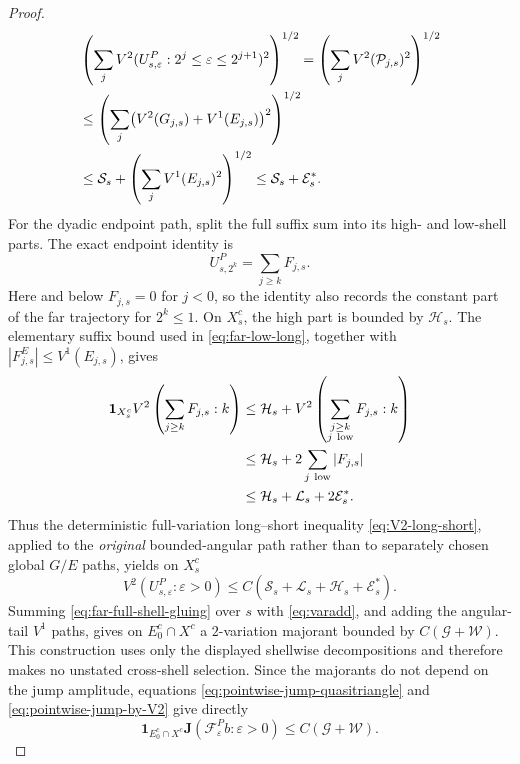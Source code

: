 \documentclass[11pt]{article}
\numberwithin{equation}{section}
\theoremstyle{remark}
\theoremstyle{definition}
\newcommand{\cF}{\mathcal F}
\begin{document}
\begin{proof}
\begin{align}
 &\left(\sum_j
 V^2(U^P_{s,\varepsilon}:2^j\le\varepsilon\le2^{j+1})^2\right)^{1/2}
 =\left(\sum_jV^2(\mathcal P_{j,s})^2\right)^{1/2}\notag\\
 &\le \left(\sum_j
       \bigl(V^2(G_{j,s})+V^1(E_{j,s})\bigr)^2\right)^{1/2}\notag\\
 &\le \mathcal S_s+
       \left(\sum_jV^1(E_{j,s})^2\right)^{1/2}
 \le \mathcal S_s+\mathcal E_s^*.
 \label{eq:far-full-short-gluing}
\end{align}
For the dyadic endpoint path, split the full suffix sum into its high- and
low-shell parts.  The exact endpoint identity is
\[
 U^P_{s,2^k}=\sum_{j\ge k}F_{j,s}.
\]
Here and below \(F_{j,s}=0\) for \(j<0\), so the identity also records the
constant part of the far trajectory for \(2^k\le1\).
On \(X_s^c\), the high part is bounded by
\(\mathcal H_s\).  The elementary suffix bound used in
\eqref{eq:far-low-long}, together with
\(|F^E_{j,s}|\le V^1(E_{j,s})\), gives
\begin{align}
 \mathbf1_{X_s^c}
 V^2\left(\sum_{j\ge k}F_{j,s}:k\right)
 &\le \mathcal H_s+
       V^2\left(\sum_{\substack{j\ge k\\j\ {\rm low}}}F_{j,s}:k\right)
       \notag\\
 &\le \mathcal H_s+2\sum_{j\ {\rm low}}|F_{j,s}|\notag\\
 &\le \mathcal H_s+\mathcal L_s+2\mathcal E_s^*.
 \label{eq:far-full-long-gluing}
\end{align}
Thus the deterministic full-variation long--short inequality
\eqref{eq:V2-long-short}, applied to the \emph{original} bounded-angular
path rather than to separately chosen global \(G/E\) paths, yields on
\(X_s^c\)
\begin{equation}\label{eq:far-full-shell-gluing}
 V^2(U^P_{s,\varepsilon}:\varepsilon>0)
 \le C(\mathcal S_s+\mathcal L_s+\mathcal H_s+\mathcal E_s^*).
\end{equation}
Summing \eqref{eq:far-full-shell-gluing} over \(s\) with
\eqref{eq:varadd}, and adding the angular-tail \(V^1\) paths, gives on
\(E_0^c\cap X^c\) a \(2\)-variation majorant bounded by
\(C(\mathcal G+\mathcal W)\).  This construction uses only the displayed
shellwise decompositions and therefore makes no unstated cross-shell
selection.  Since the majorants do not depend on the jump amplitude,
equations
\eqref{eq:pointwise-jump-quasitriangle} and
\eqref{eq:pointwise-jump-by-V2} give directly
\begin{equation}\label{eq:far-pointwise-majorant}
 \mathbf1_{E_0^c\cap X^c}
 \mathbf J(\cF^P_\varepsilon b:\varepsilon>0)
 \le C(\mathcal G+\mathcal W).
\end{equation}


\end{proof}
\end{document}
